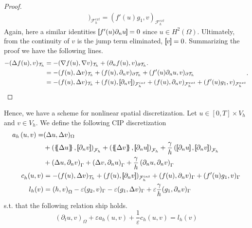 \begin{proof}
\[\begin{split}
                                                                             )_{\mathcal{F} _{h}^{ext}} = ( f'( u)  g_{1}   ,  v
                                                                             )_{\mathcal{F} ^{ext}_{h} }
    \end{split}
\]
Again, here a similar identities $\left[\!\!\left[   f' ( u) \partial _{n} u \right]\!\!\right] = 0  $ since $u \in H^2( \Omega ) $. Ultimately, from the continuity of $v$ is the jump term eliminated, $ \left[\!\!\left[ v \right]\!\!\right] = 0 $. Summarizing the proof we have the following lines.
\[
    \begin{split}
-(\Delta f( u) , v)_{ \mathcal{T}_{h}  } &= -(\nabla f( u), \nabla v  )_{ \mathcal{T}_{h}  } + ( \partial _{n}  f( u), v )_{\partial \mathcal{T}_{h}  }.\\
                    & = -( f( u), \Delta v )_{\mathcal{T} _{h}} + (f( u), \partial _{n} v  )_{\partial \mathcal{T} _{h}} + (   f'( u)\partial _{n}u, v )_{\partial \mathcal{T} _{h} } \\
&= -( f( u), \Delta v )_{\mathcal{T} _{h}} +  ( f( u) , \left[\!\!\left[  \partial _{n}v  \right]\!\!\right]  )_{\mathcal{F} _{h}^{int}} + ( f(u), \partial _{n} v)_{\mathcal{F}^{ext}_{h} }  + ( f'( u)  g_{1}   ,  v)_{\mathcal{F} _{h}^{ext}}
    \end{split}
.
\]
\end{proof}

Hence, we have a scheme for nonlinear spatial discretization. Let $u \in \left[ 0,T \right] \times V_{h}  $ and $v \in V_{h}$. We define the following CIP discretization
\begin{equation}
    \label{eq:cip_ch}
    \begin{split}
        a_{h} \left( u, v \right)   =& ( \Delta  u, \Delta v ) _{ \Omega } \\
                                     & + \left( \mean{  \Delta  u }, \jump{ \partial _{n }v} \right)_{\mathcal{F}_{h}  }  + \left( \mean{ \Delta  v }, \jump{ \partial _{n}u }      \right)_{\mathcal{F}_{h}  }  + \frac{\gamma }{h}  \left( \jump{ \partial _{n} u}, \jump{ \partial _{n} v   }   \right)_{\mathcal{F}_{h} } \\
                                     & + \left(   \Delta  u ,  \partial _{n }v \right)_{\Gamma   }  + \left(  \Delta  v ,  \partial _{n}u       \right)_{\Gamma  }  + \frac{\gamma }{h}  \left(  \partial _{n} u,  \partial _{n} v      \right)_{ \Gamma } \\
    c^{}_{h} ( u,v)  & = -( f( u), \Delta v )_{\mathcal{T} _{h}}+  ( f( u) , \jump{ \partial _{n}v }  )_{\mathcal{F} _{h}^{int}} + ( f(u), \partial _{n} v)_{\Gamma  }  + ( f'( u)  g_{1}   ,  v)_{\Gamma } \\
    l_{h}( v_{}) & =  \left( h, v \right) _{\Omega } -  \varepsilon ( g_{2},  v )_{\Gamma }  -  \varepsilon ( g_{1}, \Delta  v  )_{\Gamma }  + \varepsilon \frac{\gamma }{h} ( g_{1}, \partial _{n} v  )_{\Gamma }
    \end{split}
\end{equation}
s.t. that the following relation ship holds.
\[
    ( \partial _{t}u, v)_\Omega + \varepsilon  a_{h}( u,v) + \frac{1}{\varepsilon }c_{h}( u,v)   =  l_{h}(v)
\]


